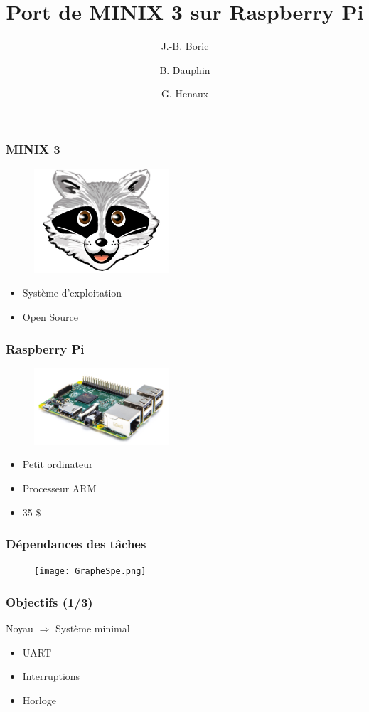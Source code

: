 \documentclass{beamer}
\begin{document}
\title{Port de MINIX 3 sur Raspberry Pi}
\author{J.-B. Boric \and B. Dauphin \and G. Henaux}
\maketitle

\begin{frame}
\frametitle{MINIX 3}
\begin{figure}[center]
\includegraphics[width=5cm,natwidth=696,natheight=540]{minix3.png}
\end{figure}
\begin{itemize}
\item Système d'exploitation
\item Open Source
\end{itemize}
\end{frame}

\begin{frame}
\frametitle{Raspberry Pi}
\begin{figure}[center]
\includegraphics[width=5cm,natwidth=800,natheight=453]{rpi.png}
\end{figure}
\begin{itemize}
\item Petit ordinateur
\item Processeur ARM
\item 35 \$
\end{itemize}
\end{frame}

\begin{frame}
\frametitle{Dépendances des tâches}
\begin{figure}[center]
\texttt{[image: GrapheSpe.png]}
\end{figure}
\end{frame}

\begin{frame}
\frametitle{Objectifs (1/3)}
Noyau $\Rightarrow$ Système minimal
\begin{itemize}
\item UART
\item Interruptions
\item Horloge
\end{itemize}
\end{frame}
\end{document}

